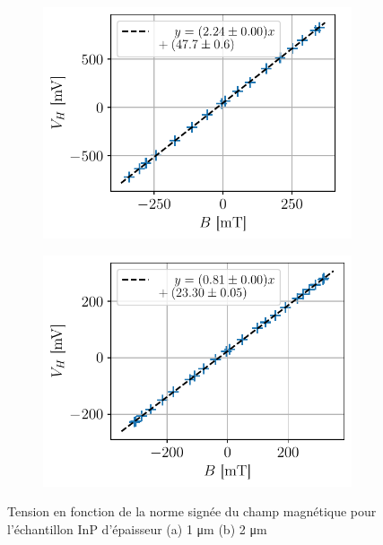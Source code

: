 \begin{figure}[h]
    \centering
    \begin{subfigure}{0.45\textwidth}
        \centering
        \includegraphics[width=\textwidth]{figures/U(B),InP1micro.pdf}
        \caption{}
    \end{subfigure}
    \begin{subfigure}{0.45\textwidth}
        \centering
        \includegraphics[width=\textwidth]{figures/U(B),InP2micro.pdf}
        \caption{}
    \end{subfigure}
    \caption{Tension en fonction de la norme signée du champ magnétique pour l'échantillon InP d'épaisseur (a) 1 \si{\micro\meter} (b) 2 \si{\micro\meter}}
\end{figure}
